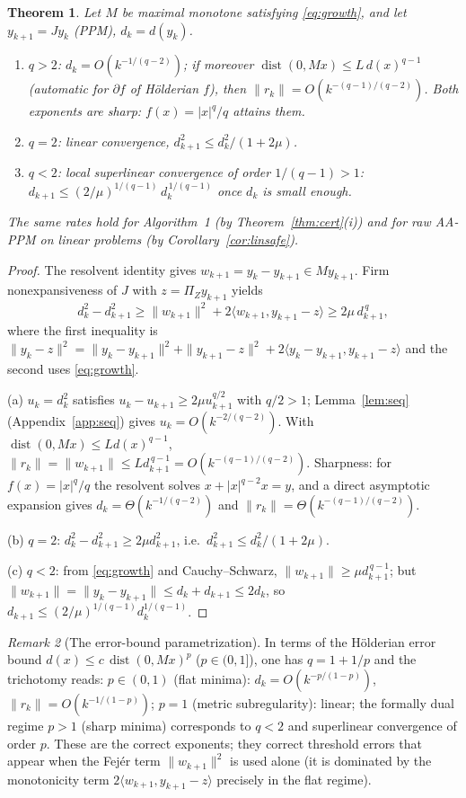 \documentclass[11pt]{article}
\newtheorem{theorem}{Theorem}[section]
\theoremstyle{definition}
\theoremstyle{remark}
\newtheorem{remark}[theorem]{Remark}
\DeclareMathOperator{\dist}{dist}
\newcommand{\inner}[2]{\langle #1, #2 \rangle}
\newcommand{\norm}[1]{\| #1 \|}
\newcommand{\abs}[1]{| #1 |}
\begin{document}
\begin{theorem}\label{thm:growth}
Let $M$ be maximal monotone satisfying \eqref{eq:growth}, and let
$y_{k+1}=Jy_k$ (PPM), $d_k=d(y_k)$.
\begin{enumerate}[label=(\alph*)]
\item $q>2$: $d_k=O(k^{-1/(q-2)})$; if moreover
      $\dist(0,Mx)\le L\,d(x)^{q-1}$ (automatic for $\partial f$ of
      H\"olderian $f$), then
      $\norm{r_k}=O(k^{-(q-1)/(q-2)})$. Both exponents are sharp:
      $f(x)=\abs{x}^q/q$ attains them.
\item $q=2$: linear convergence,
      $d_{k+1}^2\le d_k^2/(1+2\mu)$.
\item $q<2$: local superlinear convergence of order $1/(q-1)>1$:
      $d_{k+1}\le (2/\mu)^{1/(q-1)}\,d_k^{\,1/(q-1)}$ once
      $d_k$ is small enough.
\end{enumerate}
The same rates hold for Algorithm~1 (by Theorem~\ref{thm:cert}(i)) and for
raw AA-PPM on linear problems (by Corollary~\ref{cor:linsafe}).
\end{theorem}
\begin{proof}
The resolvent identity gives $w_{k+1}=y_k-y_{k+1}\in My_{k+1}$. Firm
nonexpansiveness of $J$ with $z=\Pi_Zy_{k+1}$ yields
\[
d_k^2-d_{k+1}^2
\ge \norm{w_{k+1}}^2+2\inner{w_{k+1}}{y_{k+1}-z}
\ge 2\mu\, d_{k+1}^{\,q},
\]
where the first inequality is
$\norm{y_k-z}^2=\norm{y_k-y_{k+1}}^2+\norm{y_{k+1}-z}^2
+2\inner{y_k-y_{k+1}}{y_{k+1}-z}$ and the second uses \eqref{eq:growth}.

(a) $u_k=d_k^2$ satisfies $u_k-u_{k+1}\ge 2\mu u_{k+1}^{q/2}$ with
$q/2>1$; Lemma~\ref{lem:seq} (Appendix~\ref{app:seq}) gives
$u_k=O(k^{-2/(q-2)})$. With $\dist(0,Mx)\le Ld(x)^{q-1}$,
$\norm{r_k}=\norm{w_{k+1}}\le L d_{k+1}^{\,q-1}=O(k^{-(q-1)/(q-2)})$.
Sharpness: for $f(x)=\abs{x}^q/q$ the resolvent solves
$x+\abs{x}^{q-2}x=y$, and a direct asymptotic expansion gives
$d_k=\Theta(k^{-1/(q-2)})$ and $\norm{r_k}=\Theta(k^{-(q-1)/(q-2)})$.

(b) $q=2$: $d_k^2-d_{k+1}^2\ge2\mu d_{k+1}^2$, i.e.\
$d_{k+1}^2\le d_k^2/(1+2\mu)$.

(c) $q<2$: from \eqref{eq:growth} and Cauchy--Schwarz,
$\norm{w_{k+1}}\ge\mu d_{k+1}^{\,q-1}$; but
$\norm{w_{k+1}}=\norm{y_k-y_{k+1}}\le d_k+d_{k+1}\le 2d_k$, so
$d_{k+1}\le(2/\mu)^{1/(q-1)}d_k^{1/(q-1)}$.
\end{proof}

\begin{remark}[The error-bound parametrization]\label{rem:eb}
In terms of the H\"olderian error bound
$d(x)\le c\,\dist(0,Mx)^p$ ($p\in(0,1]$), one has $q=1+1/p$ and the
trichotomy reads: $p\in(0,1)$ (flat minima):
$d_k=O(k^{-p/(1-p)})$, $\norm{r_k}=O(k^{-1/(1-p)})$; $p=1$ (metric
subregularity): linear; the formally dual regime $p>1$ (sharp minima)
corresponds to $q<2$ and superlinear convergence of order $p$. These are
the correct exponents; they correct threshold errors that appear when the
Fej\'er term $\norm{w_{k+1}}^2$ is used alone (it is dominated by the
monotonicity term $2\inner{w_{k+1}}{y_{k+1}-z}$ precisely in the flat
regime).
\end{remark}
\end{document}
